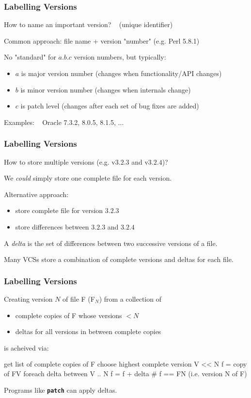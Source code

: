\begin{frame}
\frametitle{Labelling Versions}
How to name an important version? ~ {\small (unique identifier)}

Common approach: file name + version "number" (e.g. Perl 5.8.1)

No "standard" for $a.b.c$ version numbers, but typically:
\begin{itemize}
\item  $a$ is major version number {\small (changes when functionality/API changes)}
\item  $b$ is minor version number {\small (changes when internals change)}
\item  $c$ is patch level {\small (changes after each set of bug fixes are added)}
\end{itemize}
{\small 
Examples: ~ Oracle 7.3.2, 8.0.5, 8.1.5, ... 
}
\end{frame}

\begin{frame}
\frametitle{Labelling Versions}
How to store multiple versions (e.g. v$3.2.3$ and v$3.2.4$)?

We {\em{could}} simply store one complete file for each version.

Alternative approach:
\begin{itemize}
\item  store complete file for version $3.2.3$
\item  store differences between $3.2.3$ and $3.2.4$
\end{itemize}
A {\em{delta}} is the set of differences between two successive
versions of a file.

Many VCSs store a combination of complete versions and deltas for each file.

\end{frame}

\begin{frame}[fragile]
\frametitle{Labelling Versions}
Creating version $N$ of file F (F$_{N}$) from a collection of
\begin{itemize}
\item  complete copies of F whose versions $< N$
\item  deltas for all versions in between complete copies
\end{itemize}
is acheived via:
\begin{sh}
    get list of complete copies of F
    choose highest complete version V << N
    f = copy of F{V}
    foreach delta between V .. N {
       f = f + delta
    }
    # f == F{N} (i.e. version N of F)
\end{sh}

Programs like \textbf{\tt{patch}} can apply deltas.
\end{frame}

